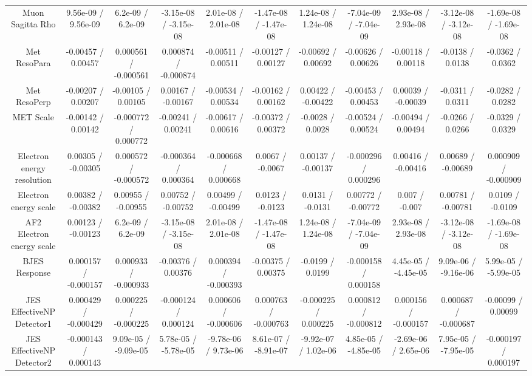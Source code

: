 \begin{table}[htbp]
\begin{center}
\begin{tabular}{|c|c|c|c|c|c|c|c|c|c|c|}
  Muon Sagitta Rho & 9.56e-09 / 9.56e-09 & 6.2e-09 / 6.2e-09 & -3.15e-08 / -3.15e-08 & 2.01e-08 / 2.01e-08 & -1.47e-08 / -1.47e-08 & 1.24e-08 / 1.24e-08 & -7.04e-09 / -7.04e-09 & 2.93e-08 / 2.93e-08 & -3.12e-08 / -3.12e-08 & -1.69e-08 / -1.69e-08 \\ 
  Met ResoPara & -0.00457 / 0.00457 & 0.000561 / -0.000561 & 0.000874 / -0.000874 & -0.00511 / 0.00511 & -0.00127 / 0.00127 & -0.00692 / 0.00692 & -0.00626 / 0.00626 & -0.00118 / 0.00118 & -0.0138 / 0.0138 & -0.0362 / 0.0362 \\ 
  Met ResoPerp & -0.00207 / 0.00207 & -0.00105 / 0.00105 & 0.00167 / -0.00167 & -0.00534 / 0.00534 & -0.00162 / 0.00162 & 0.00422 / -0.00422 & -0.00453 / 0.00453 & 0.00039 / -0.00039 & -0.0311 / 0.0311 & -0.0282 / 0.0282 \\ 
  MET Scale & -0.00142 / 0.00142 & -0.000772 / 0.000772 & -0.00241 / 0.00241 & -0.00617 / 0.00616 & -0.00372 / 0.00372 & -0.0028 / 0.0028 & -0.00524 / 0.00524 & -0.00494 / 0.00494 & -0.0266 / 0.0266 & -0.0329 / 0.0329 \\ 
  Electron energy resolution & 0.00305 / -0.00305 & 0.000572 / -0.000572 & -0.000364 / 0.000364 & -0.000668 / 0.000668 & 0.0067 / -0.0067 & 0.00137 / -0.00137 & -0.000296 / 0.000296 & 0.00416 / -0.00416 & 0.00689 / -0.00689 & 0.000909 / -0.000909 \\ 
  Electron energy scale & 0.00382 / -0.00382 & 0.00955 / -0.00955 & 0.00752 / -0.00752 & 0.00499 / -0.00499 & 0.0123 / -0.0123 & 0.0131 / -0.0131 & 0.00772 / -0.00772 & 0.007 / -0.007 & 0.00781 / -0.00781 & 0.0109 / -0.0109 \\ 
  AF2 Electron energy scale & 0.00123 / -0.00123 & 6.2e-09 / 6.2e-09 & -3.15e-08 / -3.15e-08 & 2.01e-08 / 2.01e-08 & -1.47e-08 / -1.47e-08 & 1.24e-08 / 1.24e-08 & -7.04e-09 / -7.04e-09 & 2.93e-08 / 2.93e-08 & -3.12e-08 / -3.12e-08 & -1.69e-08 / -1.69e-08 \\ 
  BJES Response & 0.000157 / -0.000157 & 0.000933 / -0.000933 & -0.00376 / 0.00376 & 0.000394 / -0.000393 & -0.00375 / 0.00375 & -0.0199 / 0.0199 & -0.000158 / 0.000158 & 4.45e-05 / -4.45e-05 & 9.09e-06 / -9.16e-06 & 5.99e-05 / -5.99e-05 \\ 
  JES EffectiveNP Detector1 & 0.000429 / -0.000429 & 0.000225 / -0.000225 & -0.000124 / 0.000124 & 0.000606 / -0.000606 & 0.000763 / -0.000763 & -0.000225 / 0.000225 & 0.000812 / -0.000812 & 0.000156 / -0.000157 & 0.000687 / -0.000687 & -0.00099 / 0.00099 \\ 
  JES EffectiveNP Detector2 & -0.000143 / 0.000143 & 9.09e-05 / -9.09e-05 & 5.78e-05 / -5.78e-05 & -9.78e-06 / 9.73e-06 & 8.61e-07 / -8.91e-07 & -9.92e-07 / 1.02e-06 & 4.85e-05 / -4.85e-05 & -2.69e-06 / 2.65e-06 & 7.95e-05 / -7.95e-05 & -0.000197 / 0.000197 \\ 

\end{tabular}
\end{center}
\end{table}
